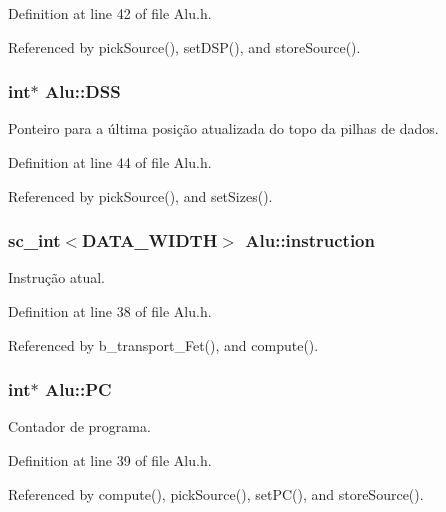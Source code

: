 Definition at line 42 of file Alu.\+h.



Referenced by pick\+Source(), set\+D\+S\+P(), and store\+Source().

\hypertarget{classAlu_ab0be93bc681fe3791cbd8a815d018a89}{
\subsubsection[{D\+S\+S}]{\setlength{\rightskip}{0pt plus 5cm}int$\ast$ Alu\+::\+D\+S\+S\hspace{0.3cm}{\ttfamily [private]}}}\label{classAlu_ab0be93bc681fe3791cbd8a815d018a89}
Ponteiro para a última posição atualizada do topo da pilhas de dados. 

Definition at line 44 of file Alu.\+h.



Referenced by pick\+Source(), and set\+Sizes().

\hypertarget{classAlu_a307709e37d80c03970b0165d29dfb4c4}{
\subsubsection[{instruction}]{\setlength{\rightskip}{0pt plus 5cm}sc\+\_\+int$<${\bf D\+A\+T\+A\+\_\+\+W\+I\+D\+T\+H}$>$ Alu\+::instruction\hspace{0.3cm}{\ttfamily [private]}}}\label{classAlu_a307709e37d80c03970b0165d29dfb4c4}
Instrução atual. 

Definition at line 38 of file Alu.\+h.



Referenced by b\+\_\+transport\+\_\+\+Fet(), and compute().

\hypertarget{classAlu_afc87096d954e9091302d7c1854a910e1}{
\subsubsection[{P\+C}]{\setlength{\rightskip}{0pt plus 5cm}int$\ast$ Alu\+::\+P\+C\hspace{0.3cm}{\ttfamily [private]}}}\label{classAlu_afc87096d954e9091302d7c1854a910e1}
Contador de programa. 

Definition at line 39 of file Alu.\+h.



Referenced by compute(), pick\+Source(), set\+P\+C(), and store\+Source().

